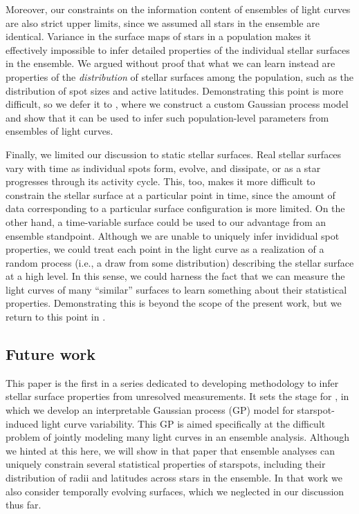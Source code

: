 \documentclass[modern]{aastex62}
\begin{document}
Moreover, our constraints on the information content of ensembles of light curves are
also strict upper limits, since we assumed all stars in the ensemble
are identical. Variance in the surface maps of stars in
a population makes it effectively impossible to infer detailed
properties of the individual stellar surfaces in the ensemble.
We argued without proof that what we can learn instead are properties of the
\emph{distribution} of stellar surfaces among the population, such as
the distribution of spot sizes and active latitudes.
Demonstrating this point is more difficult, so we defer it to
, where we construct a custom Gaussian process model
and show that it can be used to infer such population-level parameters
from ensembles of light curves.

Finally, we limited our discussion to static stellar surfaces.
Real stellar surfaces vary
with time as individual spots form, evolve, and dissipate, or as a star progresses
through its activity cycle. This, too, makes it more difficult to constrain
the stellar surface at a particular point in time, since the amount of
data corresponding to a particular surface configuration is more limited.
On the other hand, a time-variable surface could be used to our advantage
from an ensemble standpoint. Although we are unable to uniquely infer
invididual spot properties, we could treat each point in the light curve
as a realization of a random process (i.e., a draw from some distribution)
describing the stellar surface at a high level. In this sense, we could
harness the fact that we can measure the light curves of many ``similar''
surfaces to learn something about their statistical properties.
Demonstrating this is beyond the scope of the present work, but we
return to this point in .

\subsection{Future work}

This paper is the first in a series dedicated to developing
methodology to infer stellar surface properties from
unresolved measurements. It sets the stage for \citet{PaperII},
in which we develop an interpretable Gaussian process (GP) model for
starspot-induced light curve variability. This GP is aimed specifically
at the difficult problem of jointly modeling many light curves
in an ensemble analysis. Although we hinted at this here, we will show
in that paper that ensemble analyses can uniquely constrain several
statistical properties of starspots, including their distribution
of radii and latitudes across stars in the ensemble. In that work
we also consider temporally evolving surfaces, which we neglected
in our discussion thus far.
\end{document}
